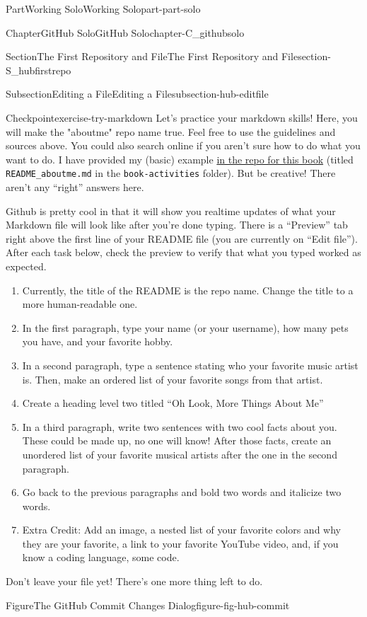 \documentclass[oneside,10pt,]{book}
\newcommand{\mono}[1]{\texttt{#1}}
\begin{document}
\begin{partptx}{Part}{Working Solo}{}{Working Solo}{}{}{part-part-solo}
\begin{chapterptx}{Chapter}{GitHub Solo}{}{GitHub Solo}{}{}{chapter-C_githubsolo}
\begin{sectionptx}{Section}{The First Repository and File}{}{The First Repository and File}{}{}{section-S_hubfirstrepo}
\begin{subsectionptx}{Subsection}{Editing a File}{}{Editing a File}{}{}{subsection-hub-editfile}
\begin{inlineexercise}{Checkpoint}{}{exercise-try-markdown}
Let's practice your markdown skills! Here, you will make the "aboutme" repo name true. Feel free to use the guidelines and sources above. You could also search online if you aren't sure how to do what you want to do. I have provided my (basic) example \href{https://github.com/ian-curtis/gitstarted}{in the repo for this book}\footnotemark{} (titled \mono{README\_aboutme.md} in the \mono{book-activities} folder). But be creative! There aren't any ``right'' answers here.%
\par
Github is pretty cool in that it will show you realtime updates of what your Markdown file will look like after you're done typing. There is a ``Preview'' tab right above the first line of your README file (you are currently on ``Edit file''). After each task below, check the preview to verify that what you typed worked as expected.%
\begin{enumerate}[font=\bfseries,label=(\alph*),ref=\alph*]%
\item{}Currently, the title of the README is the repo name. Change the title to a more human-readable one.%
\item{}In the first paragraph, type your name (or your username), how many pets you have, and your favorite hobby.%
\item{}In a second paragraph, type a sentence stating who your favorite music artist is. Then, make an ordered list of your favorite songs from that artist.%
\item{}Create a heading level two titled ``Oh Look, More Things About Me''%
\item{}In a third paragraph, write two sentences with two cool facts about you. These could be made up, no one will know! After those facts, create an unordered list of your favorite musical artists after the one in the second paragraph.%
\item{}Go back to the previous paragraphs and bold two words and italicize two words.%
\item{}Extra Credit: Add an image, a nested list of your favorite colors and why they are your favorite, a link to your favorite YouTube video, and, if you know a coding language, some code.%
\end{enumerate}%
Don't leave your file yet! There's one more thing left to do.%
\end{inlineexercise}%
%
\begin{figureptx}{Figure}{The GitHub Commit Changes Dialog}{figure-fig-hub-commit}{}%

\end{figureptx}
\end{subsectionptx}
\end{sectionptx}
\end{chapterptx}
\end{partptx}
\end{document}
